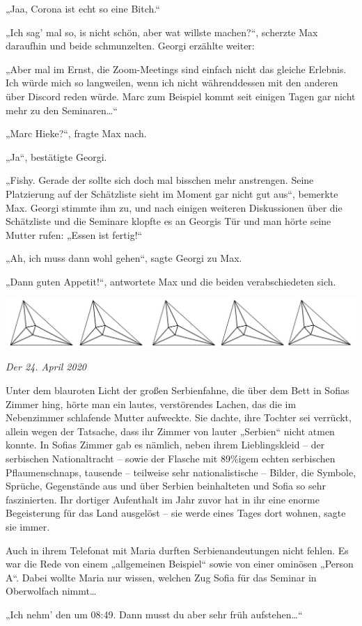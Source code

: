 \documentclass[oneside]{memoir}
\newcommand{\parasep}{
\bigskip
\bigskip
\begin{center} 
   \includegraphics[scale=.08]{parasep5.jpg} 
\end{center}
\bigskip
\bigskip
}
\begin{document}
„Jaa, Corona ist echt so eine Bitch.“

„Ich sag' mal so, is nicht schön, aber wat willste machen?“, scherzte Max daraufhin und beide schmunzelten. Georgi erzählte weiter:

„Aber mal im Ernst, die Zoom-Meetings sind einfach nicht das gleiche Erlebnis. Ich würde mich so langweilen, wenn ich nicht währenddessen mit den anderen über Discord reden würde. Marc zum Beispiel kommt seit einigen Tagen gar nicht mehr zu den Seminaren\ldots“

„Marc Hieke?“, fragte Max nach.

„Ja“, bestätigte Georgi.

„Fishy. Gerade der sollte sich doch mal bisschen mehr anstrengen. Seine Platzierung auf der Schätzliste sieht im Moment gar nicht gut aus“, bemerkte Max. Georgi stimmte ihm zu, und nach einigen weiteren Diskussionen über die Schätzliste und die Seminare klopfte es an Georgis Tür und man hörte seine Mutter rufen: „Essen ist fertig!“

„Ah, ich muss dann wohl gehen“, sagte Georgi zu Max.

„Dann guten Appetit!“, antwortete Max und die beiden verabschiedeten sich.
     
\parasep

\textit{Der 24. April 2020}

Unter dem blauroten Licht der großen Serbienfahne, die über dem Bett in Sofias Zimmer hing, hörte man ein lautes, verstörendes Lachen, das die im Nebenzimmer schlafende Mutter aufweckte. Sie dachte, ihre Tochter sei verrückt, allein wegen der Tatsache, dass ihr Zimmer von lauter „Serbien“ nicht atmen konnte. In Sofias Zimmer gab es nämlich, neben ihrem Lieblingskleid -- der serbischen Nationaltracht -- sowie der Flasche mit 89\%igem echten serbischen Pflaumenschnaps, tausende -- teilweise sehr nationalistische -- Bilder, die Symbole, Sprüche, Gegenstände aus und über Serbien beinhalteten und Sofia so sehr faszinierten. Ihr dortiger Aufenthalt im Jahr zuvor hat in ihr eine enorme Begeisterung für das Land ausgelöst -- sie werde eines Tages dort wohnen, sagte sie immer.

Auch in ihrem Telefonat mit Maria durften Serbienandeutungen nicht fehlen. Es war die Rede von einem „allgemeinen Beispiel“ sowie von einer ominösen „Person A“. Dabei wollte Maria nur wissen, welchen Zug Sofia für das Seminar in Oberwolfach nimmt\ldots

„Ich nehm' den um 08:49. Dann musst du aber sehr früh aufstehen\ldots“
\end{document}
